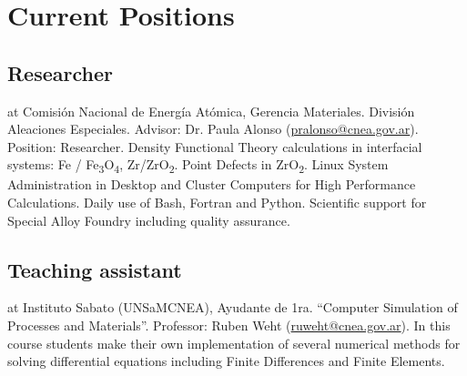\section{Current Positions}

\subsection{ Researcher} at Comisión Nacional de Energía Atómica,  Gerencia Materiales. División Aleaciones Especiales. \textbf{} Advisor: Dr. Paula Alonso (\url{pralonso@cnea.gov.ar}). Position: Researcher. Density Functional Theory calculations in interfacial systems: Fe / Fe\textsubscript{3}O\textsubscript{4}, Zr/ZrO\textsubscript{2}. Point Defects in ZrO\textsubscript{2}. Linux System Administration in Desktop and Cluster Computers for High Performance Calculations. Daily use of Bash, Fortran and Python. Scientific support for Special Alloy Foundry including quality assurance.

\subsection{Teaching assistant} at Instituto Sabato (UNSaM\-CNEA), Ayudante de 1ra. “Computer Simulation of Processes and Materials”. Professor: Ruben Weht (\url{ruweht@cnea.gov.ar}). In this course students make their own implementation of several numerical methods for solving differential equations including Finite Differences and Finite Elements.

